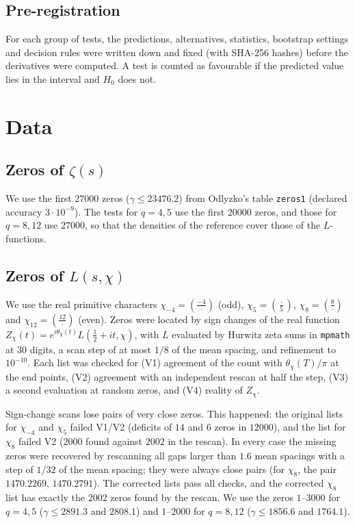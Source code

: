 \documentclass[11pt]{amsart}
\begin{document}
\subsection{Pre-registration}
For each group of tests, the predictions, alternatives, statistics, bootstrap settings and decision rules were written
down and fixed (with SHA-256 hashes) before the derivatives were computed. A test is counted as favourable if the
predicted value lies in the interval and $H_0$ does not.

\section{Data}

\subsection{Zeros of $\zeta(s)$}
We use the first $27000$ zeros ($\gamma\le 23476.2$) from Odlyzko's table \texttt{zeros1} (declared accuracy
$3\cdot10^{-9}$). The tests for $q=4,5$ use the first $20000$ zeros, and those for $q=8,12$ use $27000$, so that the
densities of the reference cover those of the $L$-functions.

\subsection{Zeros of $L(s,\chi)$}
We use the real primitive characters $\chi_{-4}=(\frac{-4}{\cdot})$ (odd), $\chi_5=(\frac{\cdot}{5})$,
$\chi_8=(\frac{8}{\cdot})$ and $\chi_{12}=(\frac{12}{\cdot})$ (even). Zeros were located by sign changes of the real
function $Z_\chi(t)=e^{i\theta_\chi(t)}L(\tfrac12+it,\chi)$, with $L$ evaluated by Hurwitz zeta sums in
\texttt{mpmath} at $30$ digits, a scan step of at most $1/8$ of the mean spacing, and refinement to $10^{-10}$. Each
list was checked for (V1) agreement of the count with $\theta_\chi(T)/\pi$ at the end points, (V2) agreement with an
independent rescan at half the step, (V3) a second evaluation at random zeros, and (V4) reality of $Z_\chi$.

Sign-change scans lose pairs of very close zeros. This happened: the original lists for $\chi_{-4}$ and $\chi_5$
failed V1/V2 (deficits of $14$ and $6$ zeros in $12000$), and the list for $\chi_8$ failed V2 ($2000$ found against $2002$
in the rescan). In every case the missing zeros were recovered by rescanning all gaps larger than $1.6$ mean spacings
with a step of $1/32$ of the mean spacing; they were always close pairs (for $\chi_8$, the pair $1470.2269$,
$1470.2791$). The corrected lists pass all checks, and the corrected $\chi_8$ list has exactly the $2002$ zeros found by
the rescan. We use the zeros $1$--$3000$ for $q=4,5$ ($\gamma\le 2891.3$ and $2808.1$) and $1$--$2000$ for $q=8,12$
($\gamma\le 1856.6$ and $1764.1$).
\end{document}
